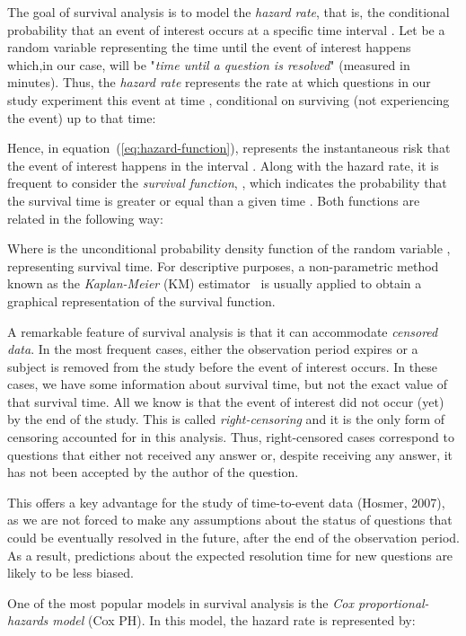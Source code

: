 \documentclass{chi2012}
\begin{document}
The goal of survival analysis is to model the \textit{hazard rate}, that is, the 
conditional probability that an event of interest occurs at a specific time interval 
. Let  be a random variable representing the time until the event of interest 
happens which,in our case, will be "\textit{time until a question is resolved}" 
(measured in minutes). 
Thus, the \textit{hazard rate} represents the rate at which questions in our study
experiment this event at time , conditional on surviving (not experiencing the event) 
up to that time:



Hence, in equation~(\ref{eq:hazard-function}),  represents the instantaneous risk 
that the event of interest happens in the interval . Along with the
hazard rate, it is frequent to consider the \textit{survival function}, , which 
indicates the probability that the survival time  is greater or equal than a given 
time . Both functions are related in the following way:



Where  is the unconditional probability density function of the random variable ,
representing survival time. For descriptive purposes, a non-parametric method known as the
\textit{Kaplan-Meier} (KM) estimator~\cite{kaplan-meier1958} is usually applied to obtain 
a graphical representation of the survival function.

A remarkable feature of survival analysis is that it can accommodate \textit{censored data}. 
In the most frequent cases, either the observation period expires or a subject is removed 
from the study before the event of interest occurs. In these cases, we have some information
about survival time, but not the exact value of that survival time. All we know is that 
the event of interest did not occur (yet) by the end of the study. This is called 
\textit{right-censoring} and it is the only form of censoring accounted for in this analysis.
Thus, right-censored cases correspond to questions that either not received any
answer or, despite receiving any answer, it has not been accepted by the author of the question.

This offers a key advantage for the study of time-to-event data (Hosmer, 2007), as we 
are not forced to make any assumptions about the status of questions that could be 
eventually resolved in the future, after the end of the observation period. As a result, predictions  about the expected resolution time 
for new questions are likely to be less biased.

One of the most popular models in survival analysis is the \textit{Cox proportional-hazards
model} (Cox PH). In this model, the hazard rate is represented by:
\end{document}
